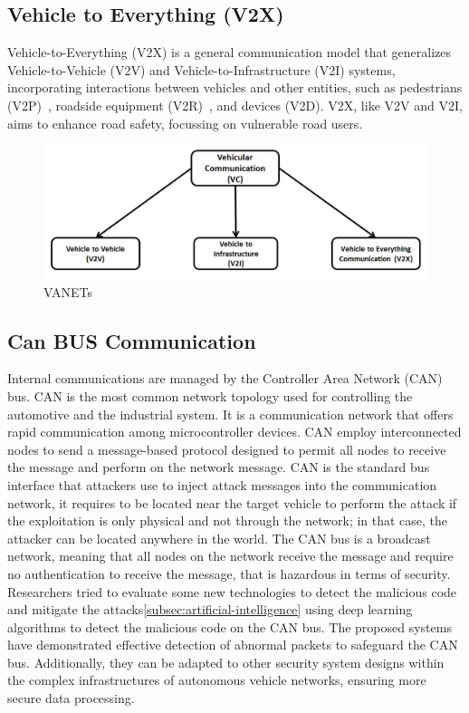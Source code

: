 \subsection{Vehicle to Everything (V2X)}\label{subsec:vehicle-to-everything-(v2x)}

Vehicle-to-Everything (V2X) is a general communication model that generalizes Vehicle-to-Vehicle (V2V) and Vehicle-to-Infrastructure (V2I) systems,
incorporating interactions between vehicles and other entities, such as pedestrians (V2P)~\cite{vehicle-to-pedestrian}, roadside equipment (V2R)~\cite{vehicle-to-roadside}, and devices (V2D).
V2X, like V2V and V2I, aims to enhance road safety, focussing on vulnerable road users.

\begin{figure}[!htb]
    \centering
    \includegraphics[width=0.7\linewidth]{figures/communication}
    \caption{VANETs}
    \label{fig:communication}
\end{figure}

\subsection{Can BUS Communication}\label{subsec:canbus-communication}
Internal communications are managed by the Controller Area Network (CAN) bus.
CAN is the most common network topology used for controlling the automotive and the industrial system.
It is a communication network that offers rapid communication among microcontroller
devices.
CAN employ interconnected nodes to send a message-based protocol designed to
permit all nodes to receive the message and perform on the network message\cite{canbus}.
CAN is the standard bus interface that attackers use to inject attack messages into the
communication network, it requires to be located near the target vehicle to perform the attack if the exploitation is only physical and not through the network; in that case, the attacker can be located anywhere in the world.
The CAN bus is a broadcast network, meaning that all nodes on the network receive the message and require no authentication to receive the message, that is hazardous in terms of security.
Researchers tried to evaluate some new technologies to detect the malicious code and mitigate the attacks\cite{aldhyani2022attacks}\ref{subsec:artificial-intelligence} using deep learning algorithms to detect the malicious code on the CAN bus.
The proposed systems have demonstrated effective detection of abnormal packets to safeguard the CAN bus.
Additionally, they can be adapted to other security system designs within the complex infrastructures of autonomous vehicle networks, ensuring more secure data processing.

